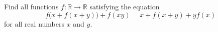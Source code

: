 Find all functions $f \colon \mathbb{R} \to \mathbb{R}$ satisfying the equation
\[
f\bigl(x + f(x + y)\bigr) + f(xy) = x + f(x + y) + y f(x)
\]
for all real numbers $x$ and $y$.
